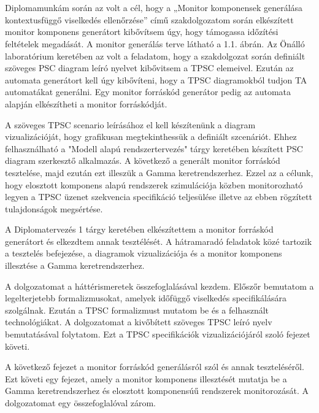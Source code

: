 \chapter{\bevezetes}
Diplomamunkám során az volt a cél, hogy a „Monitor komponensek generálása kontextusfüggő viselkedés ellenőrzése” című szakdolgozatom során elkészített monitor komponens generátort kibővítsem úgy, hogy támogassa időzítési feltételek megadását.
A monitor generálás terve látható a 1.1. ábrán.
Az Önálló laboratórium keretében az volt a feladatom, hogy a szakdolgozat során definiált szöveges PSC diagram leíró nyelvet kibővitsem a TPSC elemeivel.
Ezután az automata generátort kell úgy kibővíteni, hogy a TPSC diagramokból tudjon TA automatákat generálni.
Egy monitor forráskód generátor pedig az automata alapján elkészítheti a monitor forráskódját.

A szöveges TPSC scenario leírásához el kell készítenünk a diagram vizualizációját, hogy grafikusan megtekinthessük a definiált szcenáriót.
Ehhez felhasználható a "Modell alapú rendszertervezés" tárgy keretében készített PSC diagram szerkesztő alkalmazás.
A következő a generált monitor forráskód tesztelése, majd ezután ezt illeszük a Gamma keretrendszerhez.
Ezzel az a célunk, hogy elosztott komponens alapú rendszerek szimulációja közben monitorozható legyen a TPSC üzenet szekvencia specifikáció teljesülése illetve az ebben rögzített tulajdonságok megsértése.

A Diplomatervezés 1 tárgy keretében elkészítettem a monitor forráskód generátort és elkezdtem annak tesztélését.
A hátramaradó feladatok közé tartozik a tesztelés befejezése, a diagramok vizualizációja és a monitor komponens illesztése a Gamma keretrendszerhez.

A dolgozatomat a háttérismeretek összefoglalásával kezdem.
Előszőr bemutatom a legelterjetebb formalizmusokat, amelyek időfüggő viselkedés specifikálására szolgálnak.
Ezután a TPSC formalizmust mutatom be és a felhasznált technológiákat.
A dolgozatomat a kivőbített szöveges TPSC leíró nyelv bemutatásával folytatom.
Ezt a TPSC specifikációk vizualizációjáról szoló fejezet követi.

A következő fejezet a monitor forráskód generálásról szól és annak teszteléséről.
Ezt követi egy fejezet, amely a monitor komponens illesztését mutatja be a Gamma keretrendszerhez és elosztott komponensúű rendszerek monitorozását.
A dolgozatomat egy összefoglalóval zárom.